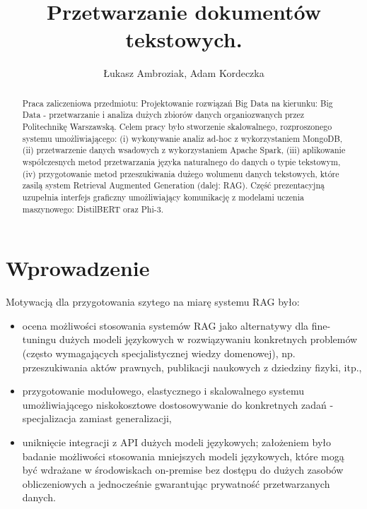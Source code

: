\documentclass[10pt]{article}
\title{Przetwarzanie dokumentów tekstowych.}
\author{Łukasz Ambroziak, Adam Kordeczka}
\begin{document}
\maketitle

\begin{abstract}
  Praca zaliczeniowa przedmiotu: Projektowanie rozwiązań Big Data na kierunku: Big Data - przetwarzanie i analiza dużych zbiorów danych organiozwanych przez Politechnikę Warszawską. Celem pracy było stworzenie skalowalnego, rozproszonego systemu umożliwiającego: (i) wykonywanie analiz ad-hoc z wykorzystaniem MongoDB, (ii) przetwarzenie danych wsadowych z wykorzystaniem Apache Spark, (iii) aplikowanie współczesnych metod przetwarzania języka naturalnego do danych o typie tekstowym, (iv) przygotowanie metod przeszukiwania dużego wolumenu danych tekstowych, które zasilą system Retrieval Augmented Generation (dalej: RAG). Część prezentacyjną uzupełnia interfejs graficzny umożliwiający komunikację z modelami uczenia maszynowego: DistilBERT oraz Phi-3.
\end{abstract}

\section{Wprowadzenie}

Motywacją dla przygotowania szytego na miarę systemu RAG było:

\begin{itemize}
  \item ocena możliwości stosowania systemów RAG jako alternatywy dla fine-tuningu dużych modeli językowych w rozwiązywaniu konkretnych problemów (często wymagających specjalistycznej wiedzy domenowej), np. przeszukiwania aktów prawnych, publikacji naukowych z dziedziny fizyki, itp.,
  \item przygotowanie modułowego, elastycznego i skalowalnego systemu umożliwiającego niskokosztowe dostosowywanie do konkretnych zadań - specjalizacja zamiast generalizacji,
  \item uniknięcie integracji z API dużych modeli językowych; założeniem było badanie możliwości stosowania mniejszych modeli językowych, które mogą być wdrażane w środowiskach on-premise bez dostępu do dużych zasobów obliczeniowych a jednocześnie gwarantując prywatność przetwarzanych danych.
\end{itemize}
\end{document}
